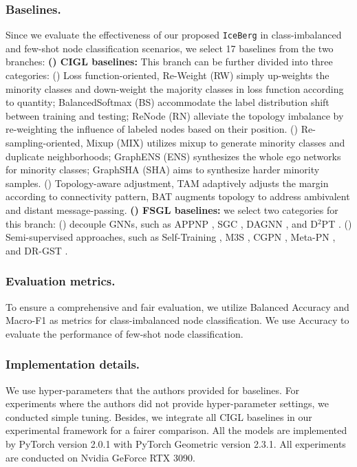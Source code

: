 \subsubsection{Baselines.} Since we evaluate the effectiveness of our proposed \texttt{IceBerg} in class-imbalanced and few-shot node classification scenarios, we select 17 baselines from the two branches: \textbf{() CIGL baselines:} This branch can be further divided into three categories: () Loss function-oriented, Re-Weight (RW) \cite{japkowicz2002class} simply up-weights the minority classes and down-weight the majority classes in loss function according to quantity; BalancedSoftmax (BS) \cite{ren2020balanced} accommodate the label distribution shift between training and testing; ReNode (RN) \cite{chen2021topology} alleviate the topology imbalance by re-weighting the influence of labeled nodes based on their position. () Re-sampling-oriented, Mixup (MIX) utilizes mixup to generate minority classes and duplicate neighborhoods; GraphENS (ENS) \cite{park2021graphens} synthesizes the whole ego networks for minority classes; GraphSHA (SHA) \cite{li2023graphsha} aims to synthesize harder minority samples. () Topology-aware adjustment, TAM \cite{song2022tam} adaptively adjusts the margin according to connectivity pattern, BAT \cite{liu2023topological} augments topology to address ambivalent and distant message-passing. \textbf{() FSGL baselines:} we select two categories for this branch: () decouple GNNs, such as APPNP \cite{gasteiger2018predict}, SGC \cite{wu2019simplifying}, DAGNN \cite{liu2020towards}, and D$^2$PT \cite{liu2023learning}. () Semi-supervised approaches, such as Self-Training \cite{li2018deeper}, M3S \cite{sun2020multi}, CGPN \cite{wan2021contrastive}, Meta-PN \cite{ding2022meta}, and DR-GST \cite{liu2022confidence}.

\subsubsection{Evaluation metrics.} To ensure a comprehensive and fair evaluation, we utilize Balanced Accuracy and Macro-F1 as metrics for class-imbalanced node classification. We use Accuracy to evaluate the performance of few-shot node classification.

\subsubsection{Implementation details.} We use hyper-parameters that the authors provided for baselines. For experiments where the authors did not provide hyper-parameter settings, we conducted simple tuning. Besides, we integrate all CIGL baselines in our experimental framework for a fairer comparison. All the models are implemented by PyTorch version 2.0.1 with PyTorch Geometric version 2.3.1. All experiments are conducted on Nvidia GeForce RTX 3090.


